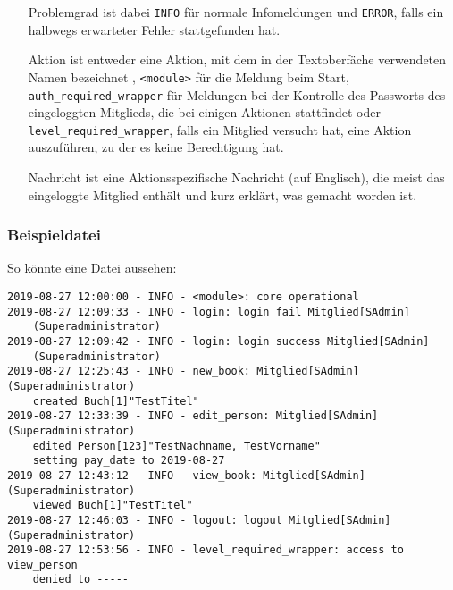 \begin{itemize}
\item[Problemgrad] ist dabei \verb#INFO# für normale Infomeldungen und \verb#ERROR#, falls ein halbwegs erwarteter Fehler stattgefunden hat.
\item[Aktion] ist entweder eine Aktion, mit dem in der Textoberfäche verwendeten Namen bezeichnet , \verb#<module># für die Meldung beim Start,
\newline \verb#auth_required_wrapper# für Meldungen bei der Kontrolle des Passworts des eingeloggten Mitglieds, die bei einigen Aktionen stattfindet oder \verb#level_required_wrapper#, falls ein Mitglied versucht hat, eine Aktion auszuführen, zu der es keine Berechtigung hat.
\item[Nachricht] ist eine Aktionsspezifische Nachricht (auf Englisch), die meist das eingeloggte Mitglied enthält und kurz erklärt, was gemacht worden ist.
\end{itemize}

\subsubsection{Beispieldatei}
\label{subsubsec:member:log:examples}

So könnte eine Datei aussehen:

\begin{verbatim}
2019-08-27 12:00:00 - INFO - <module>: core operational
2019-08-27 12:09:33 - INFO - login: login fail Mitglied[SAdmin]
	(Superadministrator)
2019-08-27 12:09:42 - INFO - login: login success Mitglied[SAdmin]
	(Superadministrator)
2019-08-27 12:25:43 - INFO - new_book: Mitglied[SAdmin](Superadministrator)
	created Buch[1]"TestTitel"
2019-08-27 12:33:39 - INFO - edit_person: Mitglied[SAdmin](Superadministrator)
	edited Person[123]"TestNachname, TestVorname"
	setting pay_date to 2019-08-27
2019-08-27 12:43:12 - INFO - view_book: Mitglied[SAdmin](Superadministrator)
	viewed Buch[1]"TestTitel"
2019-08-27 12:46:03 - INFO - logout: logout Mitglied[SAdmin](Superadministrator)
2019-08-27 12:53:56 - INFO - level_required_wrapper: access to view_person
	denied to -----
\end{verbatim}


